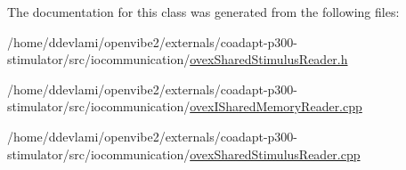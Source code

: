 The documentation for this class was generated from the following files:\begin{DoxyCompactItemize}
\item 
/home/ddevlami/openvibe2/externals/coadapt-\/p300-\/stimulator/src/iocommunication/\hyperlink{ovexSharedStimulusReader_8h}{ovexSharedStimulusReader.h}\item 
/home/ddevlami/openvibe2/externals/coadapt-\/p300-\/stimulator/src/iocommunication/\hyperlink{ovexISharedMemoryReader_8cpp}{ovexISharedMemoryReader.cpp}\item 
/home/ddevlami/openvibe2/externals/coadapt-\/p300-\/stimulator/src/iocommunication/\hyperlink{ovexSharedStimulusReader_8cpp}{ovexSharedStimulusReader.cpp}\end{DoxyCompactItemize}
